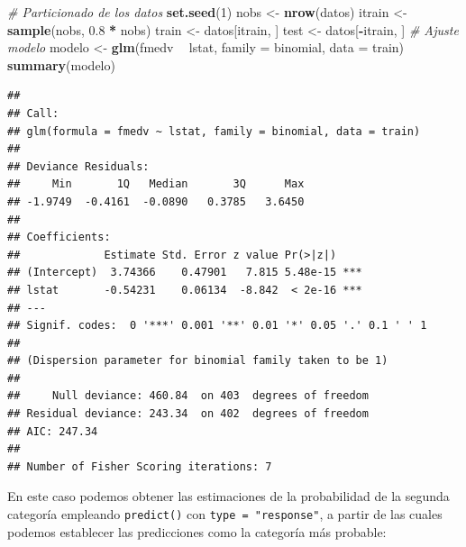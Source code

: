 \documentclass[]{book}
\newenvironment{Shaded}{\begin{snugshade}}{\end{snugshade}}
\newcommand{\KeywordTok}[1]{\textcolor[rgb]{0.13,0.29,0.53}{\textbf{#1}}}
\newcommand{\DataTypeTok}[1]{\textcolor[rgb]{0.13,0.29,0.53}{#1}}
\newcommand{\DecValTok}[1]{\textcolor[rgb]{0.00,0.00,0.81}{#1}}
\newcommand{\FloatTok}[1]{\textcolor[rgb]{0.00,0.00,0.81}{#1}}
\newcommand{\StringTok}[1]{\textcolor[rgb]{0.31,0.60,0.02}{#1}}
\newcommand{\CommentTok}[1]{\textcolor[rgb]{0.56,0.35,0.01}{\textit{#1}}}
\newcommand{\OperatorTok}[1]{\textcolor[rgb]{0.81,0.36,0.00}{\textbf{#1}}}
\newcommand{\NormalTok}[1]{#1}
\theoremstyle{break}
\theoremstyle{definition}
\theoremstyle{definition}
\theoremstyle{definition}
\theoremstyle{remark}
\begin{document}
\begin{Shaded}
\begin{Highlighting}[]
\CommentTok{# Particionado de los datos}
\KeywordTok{set.seed}\NormalTok{(}\DecValTok{1}\NormalTok{)}
\NormalTok{nobs <-}\StringTok{ }\KeywordTok{nrow}\NormalTok{(datos)}
\NormalTok{itrain <-}\StringTok{ }\KeywordTok{sample}\NormalTok{(nobs, }\FloatTok{0.8} \OperatorTok{*}\StringTok{ }\NormalTok{nobs)}
\NormalTok{train <-}\StringTok{ }\NormalTok{datos[itrain, ]}
\NormalTok{test <-}\StringTok{ }\NormalTok{datos[}\OperatorTok{-}\NormalTok{itrain, ]}
\CommentTok{# Ajuste modelo}
\NormalTok{modelo <-}\StringTok{ }\KeywordTok{glm}\NormalTok{(fmedv }\OperatorTok{~}\StringTok{ }\NormalTok{lstat, }\DataTypeTok{family =}\NormalTok{ binomial, }\DataTypeTok{data =}\NormalTok{ train)}
\KeywordTok{summary}\NormalTok{(modelo)}
\end{Highlighting}
\end{Shaded}

\begin{verbatim}
## 
## Call:
## glm(formula = fmedv ~ lstat, family = binomial, data = train)
## 
## Deviance Residuals: 
##     Min       1Q   Median       3Q      Max  
## -1.9749  -0.4161  -0.0890   0.3785   3.6450  
## 
## Coefficients:
##             Estimate Std. Error z value Pr(>|z|)    
## (Intercept)  3.74366    0.47901   7.815 5.48e-15 ***
## lstat       -0.54231    0.06134  -8.842  < 2e-16 ***
## ---
## Signif. codes:  0 '***' 0.001 '**' 0.01 '*' 0.05 '.' 0.1 ' ' 1
## 
## (Dispersion parameter for binomial family taken to be 1)
## 
##     Null deviance: 460.84  on 403  degrees of freedom
## Residual deviance: 243.34  on 402  degrees of freedom
## AIC: 247.34
## 
## Number of Fisher Scoring iterations: 7
\end{verbatim}

En este caso podemos obtener las estimaciones de la probabilidad de la
segunda categoría empleando \texttt{predict()} con
\texttt{type\ =\ "response"}, a partir de las cuales podemos establecer
las predicciones como la categoría más probable:

\begin{Shaded}
\end{Shaded}
\end{document}
